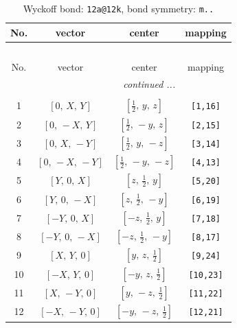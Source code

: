 \documentclass[fleqn,8pt]{jsarticle}
\begin{document}
\begin{longtable}{cccc}
\caption{Wyckoff bond: {\tt 12a@12k}, bond symmetry: {\tt m..}}
 \\
 \hline \hline
No. & vector & center & mapping \\ \hline \endfirsthead

\multicolumn{3}{l}{\tablename\ \thetable{}} \\
 \hline \hline
No. & vector & center & mapping \\ \hline \endhead

 \hline \hline
\multicolumn{3}{r}{\footnotesize\it continued ...} \\ \endfoot

 \hline \hline
\multicolumn{3}{r}{} \\ \endlastfoot

1 & $\left[ 0,\, X,\, Y \right]$ & $\left[ \frac{1}{2},\, y,\, z \right]$ & {\tt [1,16]} \\ \hline
2 & $\left[ 0,\, - X,\, Y \right]$ & $\left[ \frac{1}{2},\, - y,\, z \right]$ & {\tt [2,15]} \\ \hline
3 & $\left[ 0,\, X,\, - Y \right]$ & $\left[ \frac{1}{2},\, y,\, - z \right]$ & {\tt [3,14]} \\ \hline
4 & $\left[ 0,\, - X,\, - Y \right]$ & $\left[ \frac{1}{2},\, - y,\, - z \right]$ & {\tt [4,13]} \\ \hline
5 & $\left[ Y,\, 0,\, X \right]$ & $\left[ z,\, \frac{1}{2},\, y \right]$ & {\tt [5,20]} \\ \hline
6 & $\left[ Y,\, 0,\, - X \right]$ & $\left[ z,\, \frac{1}{2},\, - y \right]$ & {\tt [6,19]} \\ \hline
7 & $\left[ - Y,\, 0,\, X \right]$ & $\left[ - z,\, \frac{1}{2},\, y \right]$ & {\tt [7,18]} \\ \hline
8 & $\left[ - Y,\, 0,\, - X \right]$ & $\left[ - z,\, \frac{1}{2},\, - y \right]$ & {\tt [8,17]} \\ \hline
9 & $\left[ X,\, Y,\, 0 \right]$ & $\left[ y,\, z,\, \frac{1}{2} \right]$ & {\tt [9,24]} \\ \hline
10 & $\left[ - X,\, Y,\, 0 \right]$ & $\left[ - y,\, z,\, \frac{1}{2} \right]$ & {\tt [10,23]} \\ \hline
11 & $\left[ X,\, - Y,\, 0 \right]$ & $\left[ y,\, - z,\, \frac{1}{2} \right]$ & {\tt [11,22]} \\ \hline
12 & $\left[ - X,\, - Y,\, 0 \right]$ & $\left[ - y,\, - z,\, \frac{1}{2} \right]$ & {\tt [12,21]} \\
\end{longtable}
\end{document}
